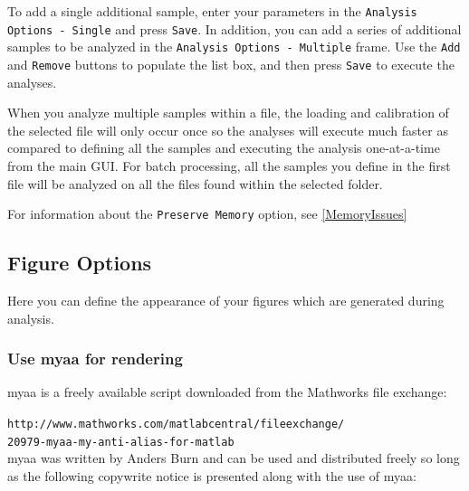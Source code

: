 \documentclass[11pt]{report}
\begin{document}
To add a single additional sample, enter your parameters in the \texttt{Analysis Options - Single} and press \texttt{Save}.  In addition, you can add a series of additional samples to be analyzed in the \texttt{Analysis Options - Multiple} frame.  Use the \texttt{Add} and \texttt{Remove} buttons to populate the list box, and then press \texttt{Save} to execute the analyses.

When you analyze multiple samples within a file, the loading and calibration of the selected file will only occur once so the analyses will execute much faster as compared to defining all the samples and executing the analysis one-at-a-time from the main GUI.  For batch processing, all the samples you define in the first file will be analyzed on all the files found within the selected folder.

For information about the \texttt{Preserve Memory} option, see \ref{MemoryIssues}

\subsection{Figure Options}
Here you can define the appearance of your figures which are generated during analysis.

\subsubsection{Use myaa for rendering}
myaa is a freely available script downloaded from the Mathworks file exchange:

 \texttt{http://www.mathworks.com/matlabcentral/fileexchange/\\20979-myaa-my-anti-alias-for-matlab}\\
 
myaa was written by Anders Burn and can be used and distributed freely so long as the following copywrite notice is presented along with the use of myaa:
\end{document}
